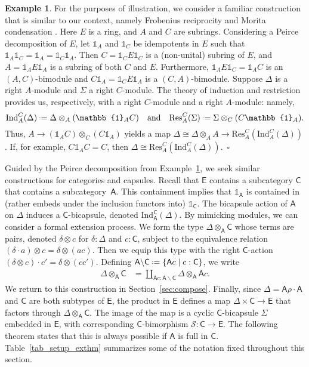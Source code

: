 \documentclass{amsart}
\newcommand{\Cat}[1]{\mathsf{#1}}
\newcommand{\cat}[1]{\Cat{#1}}
\newcommand{\acat}[1]{\mathsf{#1}}
\numberwithin{lstfloat}{section}
\newcommand{\one}{\mathbb{1}}
\newcommand{\defeq}{\mathrel{\hstretch{.13}{=}\hspace{.2ex}{=}}}
\newcommand{\func}[1]{\mathcal{#1}}
\newcommand{\cA}{\cat{A}}
\newcommand{\cC}{\cat{C}}
\newcommand{\cE}{\cat{E}}
\newcommand{\exqed}{\hfill $\square$}
\theoremstyle{definition}
\newtheorem{ex}[thm]{Example}
\theoremstyle{remark}
\numberwithin{equation}{section}
\begin{document}
\begin{ex}\label{ex_ringstuff}
For the purposes of illustration, we consider 
a familiar construction that is similar to our context, 
namely Frobenius reciprocity and Morita
condensation \cite[Theorem 25A.19]{Rowen}. 
Here $E$ is a ring, and $A$ and $C$ are subrings. Considering 
a Peirce decomposition of $E$, let $\one_A$ and $\one_C$ be
idempotents in $E$ such that
$\one_A\one_C=\one_A=\one_C\one_A$. Then $C= \one_C E\one_C$ is a
(non-unital) subring of $E$, and $A= \one_A E\one_A$ is a subring of both
$C$ and $E$. Furthermore, $\one_A E\one_C=\one_A C$ is an $(A,C)$-bimodule and
$C\one_A=\one_C E\one_A$ is a $(C,A)$-bimodule. Suppose $\Delta$ is a right
$A$-module and $\Sigma$ a right $C$-module. 
The theory of induction and restriction provides us, respectively, 
with a right $C$-module and a right $A$-module: namely, 
\begin{equation*}
  \mathrm{Ind}^C_A(\Delta) \defeq \Delta\otimes_A (\one_A C)\quad\text{and}\quad \mathrm{Res}^C_A(\Sigma) \defeq\Sigma\otimes_C (C\one_A).
\end{equation*}
Thus, $A\to (\one_A C)\otimes_C (C\one_A)$ yields a map
$\Delta\cong\Delta\otimes_A A\to \mathrm{Res}_A^C(\mathrm{Ind}_A^C(\Delta))$.
If, for example, $C\one_A C=C$, then $\Delta \cong
\mathrm{Res}_A^C(\mathrm{Ind}_A^C(\Delta))$.~\exqed
\end{ex}

Guided by the Peirce decomposition from Example~\ref{ex_ringstuff}, we seek similar
constructions for categories and capsules.  Recall that $\cE$ contains a
subcategory $\cC$ that contains a subcategory~$\cA$.  This containment implies
that $\one_{\cA}$ is contained in (rather embeds under the inclusion functors into)
$\one_{\cC}$. The bicapsule action of $\cA$ on $\Delta$ induces a
$\cC$-bicapsule, denoted $\mathrm{Ind}_{\cA}^{\cC}(\Delta)$.  By mimicking
modules, we can consider a formal extension process. We form the type
$\Delta\otimes_{\cA}\cC$ whose terms are 
pairs, denoted $\delta \otimes c$ for $\delta:\Delta$ and $c:\cC$, subject to the equivalence
relation $(\delta\cdot a)\otimes c=\delta \otimes (ac)$. Then we equip this type
with the right $\cC$-action $(\delta\otimes c)\cdot c'=\delta \otimes (cc')$. Defining $ \cA\backslash \cC \defeq \{\cA c \mid c:\cC\}$, we write
\begin{align*}
  \Delta\otimes_{\cA} \cC &= \coprod_{\cA c:\cA\backslash \cC}\Delta\otimes_{\cA} \cA c . 
\end{align*}
We return to this construction in Section~\ref{sec:compose}.
\noindent
Finally, since $\Delta = \cA\rho\cdot \cA$ and $\cC$ are both subtypes of $\cE$,
the product in $\cE$ defines a map $\Delta\times \cC\to \cE$ that factors
through $\Delta\otimes_{\cA}\cC$.  The image of the map is a cyclic
$\cC$-bicapsule $\Sigma$ embedded in $\cE$, with corresponding
$\acat{C}$-bimorphism $\func{S}:\acat{C}\to\acat{E}$.   
The following theorem
states that this is always possible if $\acat{A}$ is full in $\acat{C}$. 
Table~\ref{tab_setup_exthm}  summarizes some of the notation fixed 
throughout this section.
\end{document}
